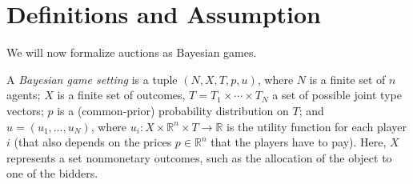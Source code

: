 \section{Definitions and Assumption}
\label{sec:auc:2}
We will now formalize auctions as Bayesian games. 

A \emph{Bayesian game setting} is a tuple $(N,X,T,p,u)$, where $N$ is a finite set of $n$ agents; $X$ is a finite set of outcomes, $T=T_1 \times \cdots \times T_N$ a set of possible joint type vectors; $p$ is a (common-prior) probability distribution on $T$; and $u=(u_1,\dots,u_N)$, where $u_i \colon X \times \mathbb{R}^n \times T \to \mathbb{R}$ is the utility function for each player $i$ (that also depends on the prices $p\in \mathbb{R}^n$ that the players have to pay). Here, $X$ represents a set nonmonetary outcomes, such as the allocation of the object to one of the bidders. 

